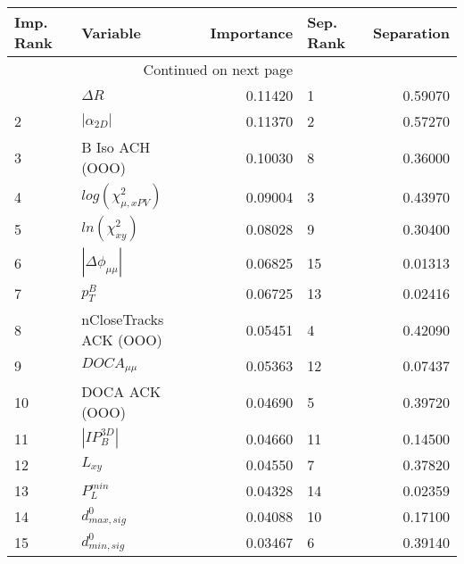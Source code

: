 \usepackage{lscape}

\begin{landscape}
\begin{longtable}{llrlr}
\toprule
Imp. Rank &                   Variable &  Importance & Sep. Rank &  Separation \\
\midrule
\endhead
\midrule
\multicolumn{3}{r}{{Continued on next page}} \\
\midrule
\endfoot

\bottomrule
\endlastfoot
        1 &                 $\Delta R$ &     0.11420 &         1 &     0.59070 \\
        2 &            $|\alpha_{2D}|$ &     0.11370 &         2 &     0.57270 \\
        3 &            B Iso ACH (OOO) &     0.10030 &         8 &     0.36000 \\
        4 &  $log(\chi^{2}_{\mu,xPV})$ &     0.09004 &         3 &     0.43970 \\
        5 &        $ln(\chi^{2}_{xy})$ &     0.08028 &         9 &     0.30400 \\
        6 &   $|\Delta \phi_{\mu\mu}|$ &     0.06825 &        15 &     0.01313 \\
        7 &                  $p^B_{T}$ &     0.06725 &        13 &     0.02416 \\
        8 &     nCloseTracks ACK (OOO) &     0.05451 &         4 &     0.42090 \\
        9 &            $DOCA_{\mu\mu}$ &     0.05363 &        12 &     0.07437 \\
       10 &             DOCA ACK (OOO) &     0.04690 &         5 &     0.39720 \\
       11 &            $|IP_{B}^{3D}|$ &     0.04660 &        11 &     0.14500 \\
       12 &                   $L_{xy}$ &     0.04550 &         7 &     0.37820 \\
       13 &              $P^{min}_{L}$ &     0.04328 &        14 &     0.02359 \\
       14 &           $d^0_{max, sig}$ &     0.04088 &        10 &     0.17100 \\
       15 &           $d^0_{min, sig}$ &     0.03467 &         6 &     0.39140 \\
\end{longtable}

\end{landscape}
